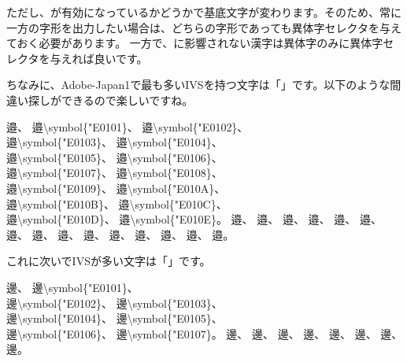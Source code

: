 \documentclass[../supplement]{subfiles}
\begin{document}
ただし、が有効になっているかどうかで基底文字が変わります。そのため、常に一方の字形を出力したい場合は、どちらの字形であっても異体字セレクタを与えておく必要があります。
一方で、に影響されない漢字は異体字のみに異体字セレクタを与えれば良いです。

ちなみに、Adobe-Japan1で最も多いIVSを持つ文字は「」です。以下のような間違い探しができるので楽しいですね。

\begin{demosource}
  邉、
  邉{\textbackslash}symbol\{"E0101\}、
  邉{\textbackslash}symbol\{"E0102\}、\\
  邉{\textbackslash}symbol\{"E0103\}、
  邉{\textbackslash}symbol\{"E0104\}、\\
  邉{\textbackslash}symbol\{"E0105\}、
  邉{\textbackslash}symbol\{"E0106\}、\\
  邉{\textbackslash}symbol\{"E0107\}、
  邉{\textbackslash}symbol\{"E0108\}、\\
  邉{\textbackslash}symbol\{"E0109\}、
  邉{\textbackslash}symbol\{"E010A\}、\\
  邉{\textbackslash}symbol\{"E010B\}、
  邉{\textbackslash}symbol\{"E010C\}、\\
  邉{\textbackslash}symbol\{"E010D\}、
  邉{\textbackslash}symbol\{"E010E\}。
  \tcblower
  邉、
  邉、
  邉、
  邉、
  邉、
  邉、
  邉、
  邉、
  邉、
  邉、
  邉、
  邉、
  邉、
  邉、
  邉。
\end{demosource}

これに次いでIVSが多い文字は「」です。

\begin{demosource}
  邊、
  邊{\textbackslash}symbol\{"E0101\}、\\
  邊{\textbackslash}symbol\{"E0102\}、
  邊{\textbackslash}symbol\{"E0103\}、\\
  邊{\textbackslash}symbol\{"E0104\}、
  邊{\textbackslash}symbol\{"E0105\}、\\
  邊{\textbackslash}symbol\{"E0106\}、
  邊{\textbackslash}symbol\{"E0107\}。
  \tcblower
  邊、
  邊、
  邊、
  邊、
  邊、
  邊、
  邊、
  邊。
\end{demosource}
\end{document}
